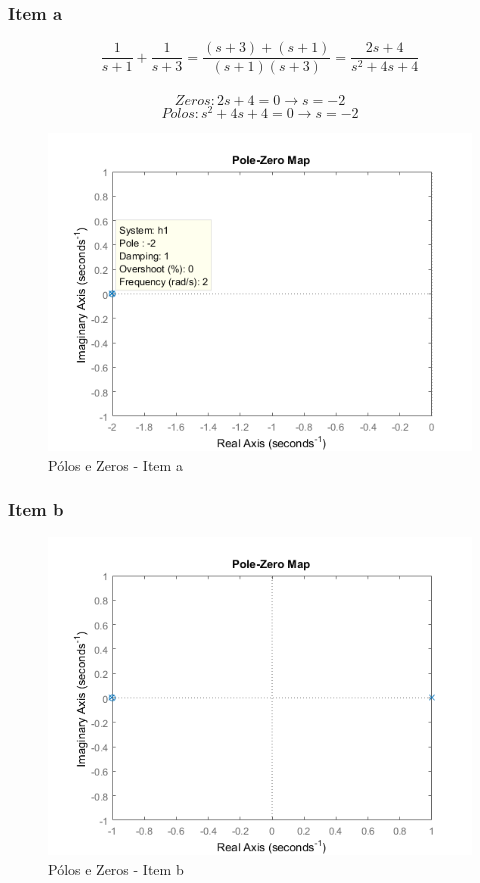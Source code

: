 \documentclass[a4paper, 12pt]{article}
\begin{document}
        \subsubsection{Item a}
        \[\frac{1}{s+1} + \frac{1}{s+3} = \frac{(s+3) + (s+1)}{(s+1)(s+3)} = \frac{2s + 4}{s^{2} + 4s + 4}\]\\
        \[Zeros: 2s + 4 = 0 \rightarrow s = -2\]
        \[Polos:  s^{2} + 4s + 4 = 0 \rightarrow s = -2\]
		\begin{figure}[!ht]
			\centering
			\includegraphics[scale=0.7]{img/Q1a.png}
			\caption{P\'{o}los e Zeros - Item a}	
		\end{figure}	        
		\newpage
        \subsubsection{Item b}
		\begin{figure}[!ht]
			\centering
			\includegraphics[scale=0.7]{img/Q1b.png}
			\caption{P\'{o}los e Zeros - Item b}	
		\end{figure}	   
		
\end{document}
